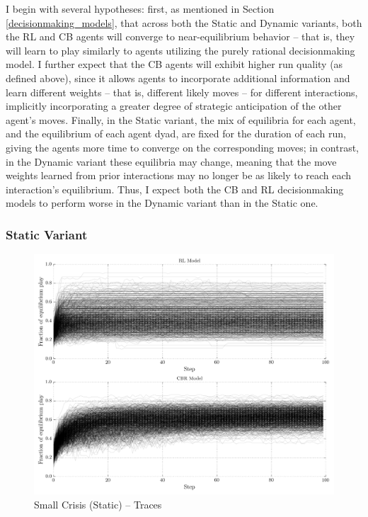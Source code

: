 I begin with several hypotheses: first, as mentioned in Section \ref{decisionmaking_models}, that across both the Static and Dynamic variants, both the RL and CB agents will converge to near-equilibrium behavior -- that is, they will learn to play similarly to agents utilizing the purely rational decisionmaking model. I further expect that the CB agents will exhibit higher run quality (as defined above), since it allows agents to incorporate additional information and learn different weights -- that is, different likely moves -- for different interactions, implicitly incorporating a greater degree of strategic anticipation of the other agent's moves. Finally, in the Static variant, the mix of equilibria for each agent, and the equilibrium of each agent dyad, are fixed for the duration of each run, giving the agents more time to converge on the corresponding moves; in contrast, in the Dynamic variant these equilibria may change, meaning that the move weights learned from prior interactions may no longer be as likely to reach each interaction's equilibrium. Thus, I expect both the CB and RL decisionmaking models to perform worse in the Dynamic variant than in the Static one.

\subsubsection{Static Variant}

\begin{figure}[h!]
	\includegraphics[width=\textwidth]{WarReason/Figures/SC_1_traces}
    \caption{Small Crisis (Static) -- Traces}
    \label{fig:sc1_traces}
    \figSpace
\end{figure}

